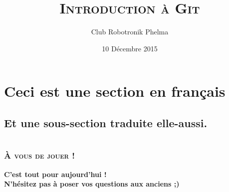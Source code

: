 \documentclass[10pt,a9paper,handout]{beamer}
\title{\textsc{Introduction à Git}}
\author{Club Robotronik Phelma}
\date{10 Décembre 2015}
\begin{document}
\setcounter{tocdepth}{1}
\begin{frame} \titlepage       \end{frame}
\begin{frame} \tableofcontents \end{frame}

\section{Ceci est une section en français}
\subsection{Et une sous-section traduite elle-aussi.}
\begin{frame}

\end{frame}

\section{}
\subsection{}
\begin{frame}
\end{frame}

\section{}
\subsection{}
\begin{frame}

\end{frame}

\section{}
\subsection{}
\begin{frame}
\end{frame}


\begin{frame}
    \frametitle{\textsc{À vous de jouer  !}}
    \begin{center}
    \Large \textbf{C'est tout pour aujourd'hui !\\ N'hésitez pas à poser vos questions aux anciens ;) }
    \end{center}
\end{frame}
\end{document}
